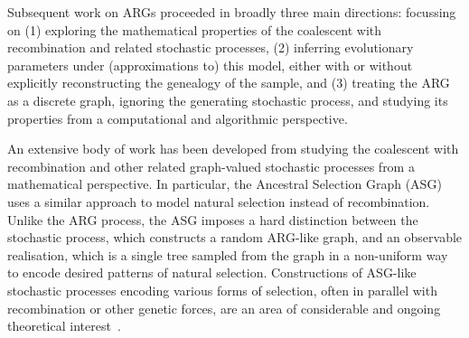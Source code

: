 \documentclass{article}
\begin{document}
Subsequent work on ARGs proceeded in broadly three main directions: focussing on (1)
exploring the mathematical properties of the coalescent with recombination and
related stochastic processes, (2) inferring evolutionary parameters under
(approximations to) this model, either with or without explicitly reconstructing the
genealogy of the sample, and (3) treating the ARG as a discrete graph, ignoring the
generating stochastic process, and studying its properties from a computational and
algorithmic perspective.

An extensive body of work has been developed from
studying the coalescent with recombination
and other related
graph-valued stochastic processes from a mathematical perspective.
In particular, the Ancestral Selection Graph
(ASG)~\citep{krone1997ancestral,neuhauser1997genealogy}
uses a similar approach to model natural selection instead of recombination.
Unlike the ARG process, the ASG imposes a hard distinction between the stochastic process,
which constructs a random ARG-like graph, and an observable realisation,
which is a single tree sampled from the graph in a non-uniform way to encode
desired patterns of natural selection.
Constructions of ASG-like stochastic processes encoding various
forms of selection, often in parallel with recombination or other genetic forces,
are an area of considerable and ongoing theoretical interest~\citep[e.g.][]{
neuhauser1999ancestral,
donnelly1999genealogical,
fearnhead2001perfect,
fearnhead2003ancestral,
etheridge2009coalescent,
gonzalezcasanova2018duality,
koskela2019robust}.
\end{document}
